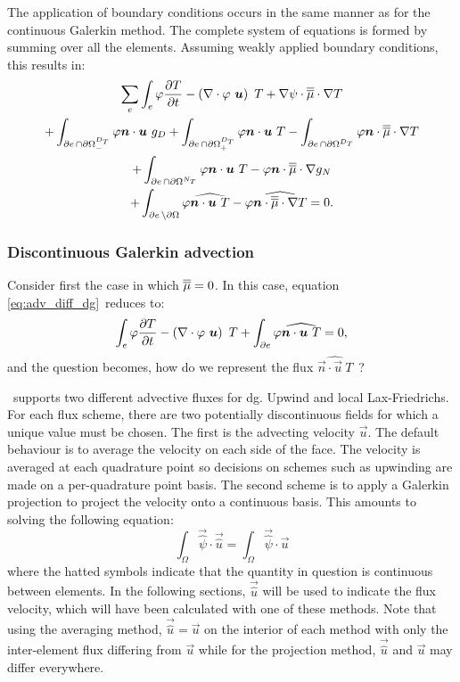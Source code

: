The application of boundary conditions occurs in the same manner as for the
continuous Galerkin method. The complete system of equations is formed
by summing over all the elements. Assuming weakly applied boundary
conditions, this results in:
\begin{multline}
  \sum_e \int_e \varphi \frac{\partial T}{\partial t} 
  - \left(\nabla\cdot \varphi~{\mbox{\boldmath$u$}}\right)~T 
  + \nabla\psi\cdot\overline{\overline{\mu}}\cdot\nabla T\\
  + \int_{\partial e\,\cap{\partial\Omega}^{D_T}_{-}} \varphi{\mbox{\boldmath$n$}}\cdot{\mbox{\boldmath$u$}}~g_D  
  + \int_{\partial e\,\cap{\partial\Omega}^{D_T}_{+}} \varphi{\mbox{\boldmath$n$}}\cdot{\mbox{\boldmath$u$}}~T  
  - \int_{\partial e\,\cap{\partial\Omega}^{D_T}}
  \varphi{\mbox{\boldmath$n$}}\cdot\overline{\overline{\mu}}\cdot\nabla T\\
  + \int_{\partial e\,\cap{\partial\Omega}^{N_T}} \varphi{\mbox{\boldmath$n$}}\cdot{\mbox{\boldmath$u$}}~T 
  - \varphi{\mbox{\boldmath$n$}}\cdot\overline{\overline{\mu}}\cdot\nabla g_N\\
  + \int_{\partial e\,\setminus{\partial\Omega}} \varphi\widehat{{\mbox{\boldmath$n$}}\cdot{\mbox{\boldmath$u$}}~T} 
  - \varphi\widehat{{\mbox{\boldmath$n$}}\cdot\overline{\overline{\mu}}\cdot\nabla T}
    = 0.      
\end{multline}

\subsubsection{Discontinuous Galerkin advection}
\label{Sect:ND_discontinuous_galerkin_advection}

Consider first the case in which $\overline{\overline{\mu}}=0$. In this case, equation
\eqref{eq:adv_diff_dg}\ reduces to:
\begin{equation}\label{eq:adv_dg}
  \int_e \varphi \frac{\partial T}{\partial t} -
    \left(\nabla\cdot \varphi~{\mbox{\boldmath$u$}}\right)~T +
    \int_{\partial e} \varphi\widehat{{\mbox{\boldmath$n$}}\cdot{\mbox{\boldmath$u$}}~T} 
    = 0,
\end{equation}
and the question becomes, how do we represent the flux
$\widehat{\vec{n}\cdot\vec{u}~T}$\ ?

\fluidity\ supports two different advective fluxes for dg. Upwind and local
Lax-Friedrichs. For each flux scheme, there are two potentially
discontinuous fields for which a unique value must be chosen. The first is
the advecting velocity $\vec{u}$. The default behaviour is to average the
velocity on each side of the face. The velocity is averaged at each
quadrature point so decisions on schemes such as upwinding are made on a
per-quadrature point basis. The second scheme is to apply a Galerkin
projection to project the velocity onto a continuous basis. This amounts to
solving the following equation:
\begin{equation}
  \int_\Omega \vec{\hat{\psi}} \cdot\vec{\hat{u}} 
  = \int_\Omega \vec{\hat{\psi}}\cdot \vec{u} 
\end{equation}
where the hatted symbols indicate that the quantity in question is
continuous between elements. In the following sections, $\vec{\hat{u}}$ will
be used to indicate the flux velocity, which will have been calculated with
one of these methods. Note that using the averaging method,
$\vec{\hat{u}}=\vec{u}$ on the interior of each method with only the inter-element
flux differing from $\vec{u}$ while for the projection method, $\vec{\hat
  u}$ and $\vec{u}$ may differ everywhere.

